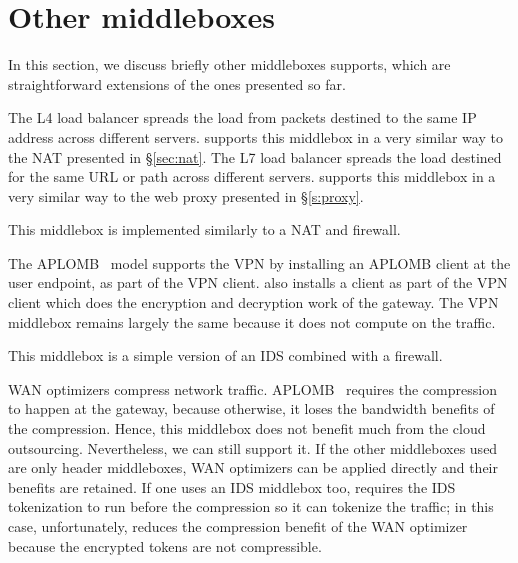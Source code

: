 
\section{Other middleboxes}\label{sec:vpn} \label{sec:other_apps} \label{sec:not_supp}\label{sec:loadb}

In this section, we discuss briefly other middleboxes \sys supports, which are straightforward extensions of the ones presented so far. 

The L4 load balancer spreads the load from packets destined to the same IP address across different servers. \sys supports this middlebox in a 
very similar way to the NAT presented in \S\ref{sec:nat}. The L7 load balancer spreads the load destined for the same URL or path across 
different servers. \sys supports this middlebox in a very similar way to the web proxy presented in \S\ref{s:proxy}. 


 This middlebox is implemented similarly to a NAT and firewall. 


 The APLOMB~\cite{aplomb} model supports the VPN by installing an APLOMB client at the user endpoint, as part of the VPN client.
\sys also installs a \sys client as part of the VPN client which does the encryption and decryption work of the gateway. The VPN middlebox remains
largely the same because it does not compute on the traffic. 


 This middlebox is a simple version of an IDS combined with a firewall. 


 WAN optimizers compress network traffic. APLOMB~\cite{aplomb} requires the compression to happen
at the gateway, because otherwise, it loses the bandwidth benefits of the compression. Hence, this middlebox does not benefit much 
 from the cloud outsourcing. 
Nevertheless, we can still support it. 
If the other middleboxes used are only header middleboxes, WAN optimizers can be applied directly and their benefits are retained.
If one uses an IDS middlebox too, \sys  requires  the IDS tokenization  to run before the compression so it can tokenize
the traffic; in this case, unfortunately, \sys  reduces the compression benefit of the WAN optimizer because the encrypted tokens 
are not compressible. 




%
%
%
%
%
%
%
%


